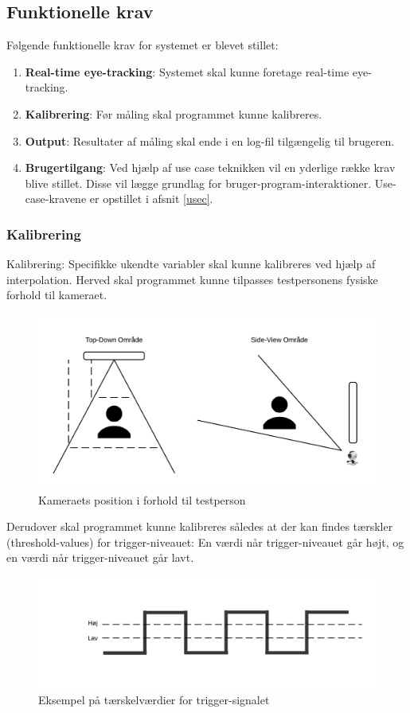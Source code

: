 \documentclass[rapport.tex]{subfiles}
\begin{document}
	\subsection{Funktionelle krav}
	Følgende funktionelle krav for systemet er blevet stillet: \\
	\begin{enumerate}
		\item 
		\textbf{Real-time eye-tracking}: Systemet skal kunne foretage real-time eye-tracking.
		\item 
		\textbf{Kalibrering}: Før måling skal programmet kunne kalibreres.
		\item
		\textbf{Output}: Resultater af måling skal ende i en log-fil tilgængelig til brugeren.
		\item
		\textbf{Brugertilgang}: Ved hjælp af use case teknikken vil en yderlige række krav blive stillet. Disse vil lægge grundlag for bruger-program-interaktioner. Use-case-kravene er opstillet i afsnit \ref{usec}.  
	\end{enumerate}
	
	\subsubsection{Kalibrering}
	Kalibrering: Specifikke ukendte variabler skal kunne kalibreres ved hjælp af interpolation. Herved skal programmet kunne tilpasses testpersonens fysiske forhold til kameraet. 
	\begin{figure}[h]
		\centering
		\includegraphics[width=0.7\linewidth]{../Kamera-testperson}
		\caption{Kameraets position i forhold til testperson}
		\label{fig:Camposition}
	\end{figure}
	
	
	Derudover skal programmet kunne kalibreres således at der kan findes tærskler (threshold-values) for trigger-niveauet: En værdi når trigger-niveauet går højt, og en værdi når trigger-niveauet går lavt.
	
	\begin{figure}[H]
		\centering
		\includegraphics[width=0.7\linewidth]{../Trigger-threshold}
		\caption{Eksempel på tærskelværdier for trigger-signalet}
		\label{fig:Trigger-threshold}
	\end{figure}
	
\end{document}

